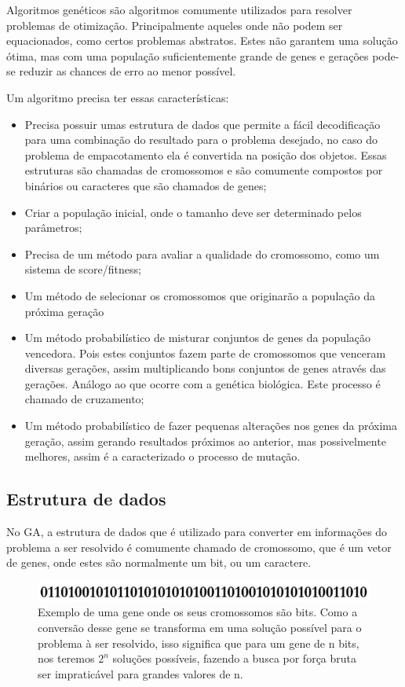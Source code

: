 \cite{book:genetic_algo_data_structure}Algoritmos genéticos são algoritmos comumente utilizados para resolver problemas de otimização. 
Principalmente aqueles onde não podem ser equacionados, como certos problemas abstratos.
Estes não garantem uma solução ótima, mas com uma população suficientemente grande de genes e gerações pode-se reduzir as chances de erro ao menor possível.

Um algoritmo precisa ter essas características:
\begin{itemize}
\item
  Precisa possuir umas estrutura de dados que permite a fácil decodificação para uma combinação do resultado para o problema desejado, no caso do problema de empacotamento ela é convertida na posição dos objetos. Essas estruturas são chamadas de cromossomos e são comumente compostos por binários ou caracteres que são chamados de genes;
\item
  Criar a população inicial, onde o tamanho deve ser determinado pelos parâmetros;
\item
  Precisa de um método para avaliar a qualidade do cromossomo, como um sistema de score/fitness;
\item
  Um método de selecionar os cromossomos que originarão a população da próxima geração
\item
  Um método probabilístico de misturar conjuntos de genes da população vencedora. Pois estes conjuntos fazem parte de cromossomos que venceram diversas gerações, assim multiplicando bons conjuntos de genes através das gerações. Análogo ao que ocorre com a genética biológica. Este processo é chamado de cruzamento; 
\item
  Um método probabilístico de fazer pequenas alterações nos genes da próxima geração, assim gerando resultados próximos ao anterior, mas possivelmente melhores, assim é a caracterizado o processo de mutação.
\end{itemize}

\subsection{Estrutura de dados}
    No GA, a estrutura de dados que é utilizado para converter em informações do problema a ser resolvido é comumente chamado de cromossomo, que é um vetor de genes, onde estes são normalmente um bit, ou um caractere.

\begin{figure}[h]
    \centering
    \includegraphics[scale=0.65]{Capitulos/Cap01_figs/genes_bit.png}
    \caption{Exemplo de uma gene onde os seus cromossomos são bits. Como a conversão desse gene se transforma em uma solução possível para o problema à ser resolvido, isso significa que para um gene de n bits, nos teremos $2^{n}$ soluções possíveis, fazendo a busca por força bruta ser impraticável para grandes valores de n.}
    \label{fig:Cap01_Genes_Bits_Example}
\end{figure}

